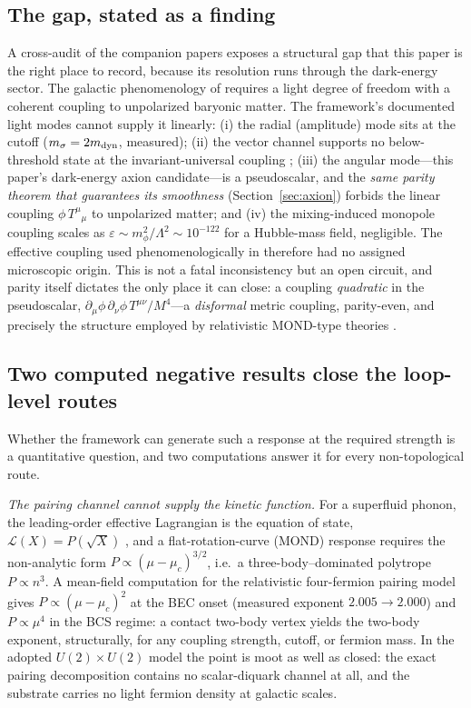 \documentclass[11pt]{article}
\begin{document}
\subsection{The gap, stated as a finding}

A cross-audit of the companion papers exposes a structural gap that
this paper is the right place to record, because its resolution runs
through the dark-energy sector.  The galactic phenomenology of
\cite{Cheng:2025sparc} requires a light degree of freedom with a
coherent coupling to unpolarized baryonic matter.  The framework's
documented light modes cannot supply it linearly:
(i) the radial (amplitude) mode sits at the cutoff
($m_\sigma = 2m_{\rm dyn}$, measured);
(ii) the vector channel supports no below-threshold state at the
invariant-universal coupling \cite{Cheng:2026vector};
(iii) the angular mode---this paper's dark-energy axion candidate---is a
pseudoscalar, and the \emph{same parity theorem that guarantees its
smoothness} (Section~\ref{sec:axion}) forbids the linear coupling
$\phi\,T^\mu{}_\mu$ to unpolarized matter; and
(iv) the mixing-induced monopole coupling scales as
$\varepsilon \sim m_\phi^2/\Lambda^2 \sim 10^{-122}$ for a
Hubble-mass field, negligible.
The effective coupling used phenomenologically in
\cite{Cheng:2025sparc} therefore had no assigned microscopic origin.
This is not a fatal inconsistency but an open circuit, and parity
itself dictates the only place it can close: a coupling
\emph{quadratic} in the pseudoscalar,
$\partial_\mu\phi\,\partial_\nu\phi\,T^{\mu\nu}/M^4$---a
\emph{disformal} metric coupling, parity-even, and precisely the
structure employed by relativistic MOND-type theories
\cite{Bekenstein:2004ne}.

\subsection{Two computed negative results close the loop-level
routes}

Whether the framework can generate such a response at the required
strength is a quantitative question, and two computations answer it
for every non-topological route.

\emph{The pairing channel cannot supply the kinetic function.}
For a superfluid phonon, the leading-order effective Lagrangian is
the equation of state, $\mathcal{L}(X) = P(\sqrt{X})$
\cite{Son:2002zn}, and a flat-rotation-curve (MOND) response requires
the non-analytic form $P \propto (\mu-\mu_c)^{3/2}$, i.e.\ a
three-body--dominated polytrope $P \propto n^3$.  A mean-field
computation for the relativistic four-fermion pairing model gives
$P \propto (\mu-\mu_c)^{2}$ at the BEC onset (measured exponent
$2.005 \to 2.000$) and $P \propto \mu^4$ in the BCS regime: a
contact two-body vertex yields the two-body exponent, structurally,
for any coupling strength, cutoff, or fermion mass.  In the adopted
$U(2)\times U(2)$ model the point is moot as well as closed: the
exact pairing decomposition contains no scalar-diquark channel at
all, and the substrate carries no light fermion density at galactic
scales.
\end{document}
